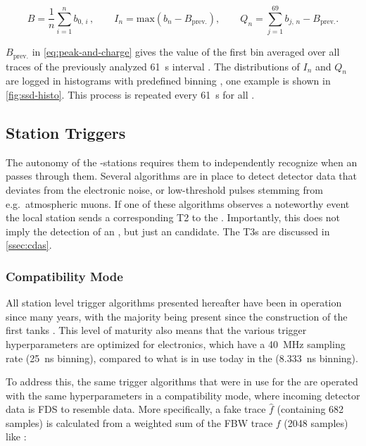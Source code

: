 \begin{equation}
\label{eq:peak-and-charge}
B = \frac{1}{n} \sum^n_{i=1} b_{0,\,i}\,, \qquad I_n = \mathrm{max}\left( b_{n} - B_\mathrm{prev.} \right), \qquad Q_n = \sum^{69}_{j=1} b_{j,\,n} - B_\mathrm{prev.}. 
\end{equation}

$B_\mathrm{prev.}$ in \cref{eq:peak-and-charge} gives the value of the first 
bin averaged over all traces of the previously analyzed \SI{61}{\second} 
interval \cite{satoUUBDAQV128r0b0p292024}. The distributions of $I_n$ and $Q_n$
are logged in histograms with predefined binning 
\cite{bertouCalibrationSurfaceArray2006}, one example is shown in 
\cref{fig:ssd-histo}. This process is repeated every \SI{61}{\second} for all 
\PMTs. 

\subsection{Station Triggers}
\label{ssec:sd-triggers}

The autonomy of the \SD-stations requires them to independently recognize when
an \EAS passes through them. Several algorithms are in place to detect detector
data that deviates from the electronic noise, or low-threshold pulses stemming 
from e.g.\ atmospheric muons. If one of these algorithms observes a noteworthy event
the local station sends a corresponding \acf{T2} to the \CDAS. Importantly, 
this does not imply the detection of an \EAS, but just an \EAS candidate. The 
\acfp{T3} are discussed in \cref{ssec:cdas}. 

\subsubsection{Compatibility Mode}

All station level trigger algorithms presented hereafter have been in operation
since many years, with the majority being present since the construction of the
first \WCD tanks \cite{thepierreaugercollaborationPierreAugerObservatory1997}. 
This level of maturity also means that the various trigger hyperparameters are
optimized for \UB electronics, which have a \SI{40}{\mega\hertz} sampling rate
(\SI{25}{\nano\second} binning), compared to what is in use today in the \UUB 
(\SI{8.333}{\nano\second} binning). 

To address this, the same trigger algorithms that were in use for the \UB are 
operated with the same hyperparameters in a compatibility mode, where incoming 
\UUB detector data is \acf{FDS} to resemble \UB data. More specifically, a 
\FDS fake \UB trace $\hat{f}$ (containing 682 samples) is calculated from a 
weighted sum of the \acf{FBW} trace $f$ (2048 samples) like  
\cite{convengaLocalStationCalibrationDummies2023}:

